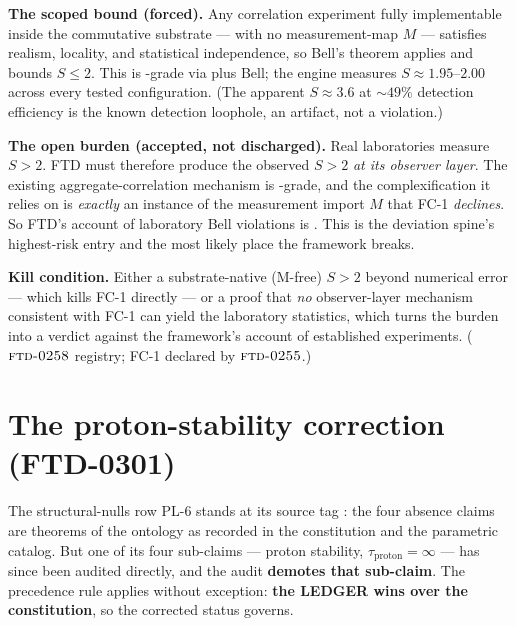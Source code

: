 \begin{boundarybox}
\textbf{The scoped bound (forced).} Any correlation experiment fully
implementable inside the commutative substrate --- with no measurement-map $M$ ---
satisfies realism, locality, and statistical independence, so Bell's theorem
applies and bounds $S\le2$. This is -grade via  plus Bell;
the engine measures $S\approx1.95\text{--}2.00$ across every tested
configuration. (The apparent $S\approx3.6$ at $\sim49\%$ detection efficiency is
the known detection loophole, an artifact, not a violation.)

\smallskip
\textbf{The open burden (accepted, not discharged).} Real laboratories measure
$S>2$. FTD must therefore produce the observed $S>2$ \emph{at its observer
layer}. The existing aggregate-correlation mechanism is -grade, and the
complexification it relies on is \emph{exactly} an instance of the measurement
import $M$ that FC-1 \emph{declines}. So FTD's account of laboratory Bell
violations is . This is the deviation spine's highest-risk entry and
the most likely place the framework breaks.

\smallskip
\textbf{Kill condition.} Either a substrate-native (M-free) $S>2$ beyond
numerical error --- which kills FC-1 directly --- or a proof that \emph{no}
observer-layer mechanism consistent with FC-1 can yield the laboratory
statistics, which turns the burden into a verdict against the framework's account
of established experiments. ($\textsc{ftd-0258}$ registry; FC-1 declared by
$\textsc{ftd-0255}$.)
\end{boundarybox}

\section{The proton-stability correction (FTD-0301)}\label{sec:proton-correction}

The structural-nulls row PL-6 stands at its source tag : the four
absence claims are theorems of the ontology as recorded in the constitution and
the parametric catalog. But one of its four sub-claims --- proton stability,
$\tau_{\text{proton}}=\infty$ --- has since been audited directly, and the audit
\textbf{demotes that sub-claim}. The precedence rule applies without exception:
\textbf{the LEDGER wins over the constitution}, so the corrected status governs.

